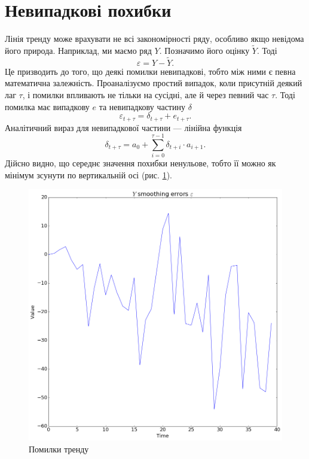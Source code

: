 \section{Невипадкові похибки}

Лінія тренду може врахувати не всі закономірності ряду,
особливо якщо невідома його природа.
Наприклад, ми маємо ряд $Y$.
Позначимо його оцінку $\tilde{Y}$.
Тоді
\begin{equation*}
  \varepsilon = Y - \tilde{Y}.
\end{equation*}
Це призводить до того, що деякі помилки невипадкові,
тобто між ними є певна математична залежність.
Проаналізуємо простий випадок,
коли присутній деякий лаг $\tau$,
і помилки впливають не тільки на сусідні,
але й через певний час $\tau$.
Тоді помилка має випадкову $e$ та невипадкову частину $\delta$
\begin{equation*}
  \varepsilon_{t + \tau} = \delta_{t + \tau} + e_{t + \tau}.
\end{equation*}
Аналітичний вираз для невипадкової частини --- лінійна функція
\begin{equation}\label{nonrandom_error:eq}
  \delta_{t + \tau}
  = a_0 + \sum_{i = 0}^{\tau - 1} \delta_{t + i} \cdot a_{i + 1}.
\end{equation}
Дійсно видно, що середнє значення похибки ненульове,
тобто її можно як мінімум зсунути по вертикальній осі
(рис. \ref{fig:error:source}).
\begin{figure}[h!]
  \centering
  \includegraphics[width=\textwidth]{Coursework_files/Coursework_27_0.png}
  \caption{Помилки тренду}
  \label{fig:error:source}
\end{figure}

